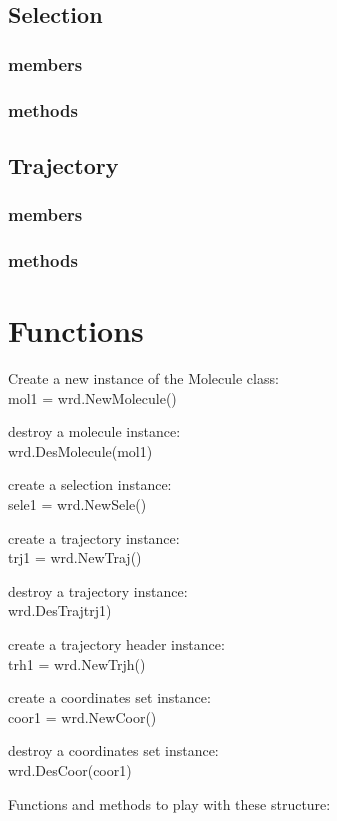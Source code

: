 \documentclass[11pt,twoside,onecolumn,a4paper,openright,notitlepage]{book}[2001/04/21]
\begin{document}
\subsection{Selection}
\subsubsection{members}
\subsubsection{methods}

\subsection{Trajectory}
\subsubsection{members}
\subsubsection{methods}

\section{Functions}


Create a new instance of the Molecule class:\\
mol1 = wrd.NewMolecule()

destroy a molecule instance:\\
wrd.DesMolecule(mol1)

create a selection instance:\\
sele1 = wrd.NewSele()

create a trajectory instance:\\
trj1 = wrd.NewTraj()

destroy a trajectory instance:\\
wrd.DesTrajtrj1)

create a trajectory header instance:\\
trh1 = wrd.NewTrjh()

create a coordinates set instance:\\
coor1 = wrd.NewCoor()

destroy a coordinates set instance:\\
wrd.DesCoor(coor1)

Functions and methods to play with these structure:
\end{document}
